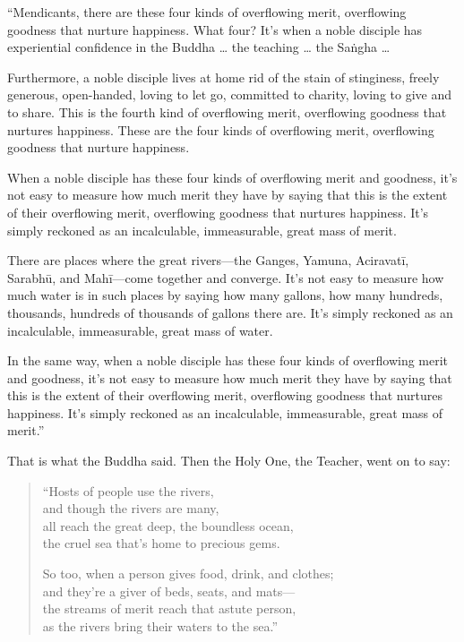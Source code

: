 \documentclass[12pt,openany]{book}%
\begin{document}
“Mendicants, there are these four kinds of overflowing merit, overflowing goodness that nurture happiness. What four? It’s when a noble disciple has experiential confidence in the Buddha … the teaching … the \textsanskrit{Saṅgha} … 

Furthermore, a noble disciple lives at home rid of the stain of stinginess, freely generous, open-handed, loving to let go, committed to charity, loving to give and to share. This is the fourth kind of overflowing merit, overflowing goodness that nurtures happiness. These are the four kinds of overflowing merit, overflowing goodness that nurture happiness. 

When a noble disciple has these four kinds of overflowing merit and goodness, it’s not easy to measure how much merit they have by saying that this is the extent of their overflowing merit, overflowing goodness that nurtures happiness. It’s simply reckoned as an incalculable, immeasurable, great mass of merit. 

There are places where the great rivers—the Ganges, Yamuna, \textsanskrit{Aciravatī}, \textsanskrit{Sarabhū}, and \textsanskrit{Mahī}—come together and converge. It’s not easy to measure how much water is in such places by saying how many gallons, how many hundreds, thousands, hundreds of thousands of gallons there are. It’s simply reckoned as an incalculable, immeasurable, great mass of water. 

In the same way, when a noble disciple has these four kinds of overflowing merit and goodness, it’s not easy to measure how much merit they have by saying that this is the extent of their overflowing merit, overflowing goodness that nurtures happiness. It’s simply reckoned as an incalculable, immeasurable, great mass of merit.” 

That is what the Buddha said. Then the Holy One, the Teacher, went on to say: 

\begin{verse}%
“Hosts of people use the rivers, \\
and though the rivers are many, \\
all reach the great deep, the boundless ocean, \\
the cruel sea that’s home to precious gems. 

So too, when a person gives food, drink, and clothes; \\
and they’re a giver of beds, seats, and mats—\\
the streams of merit reach that astute person, \\
as the rivers bring their waters to the sea.” 

%
\end{verse}
\end{document}
